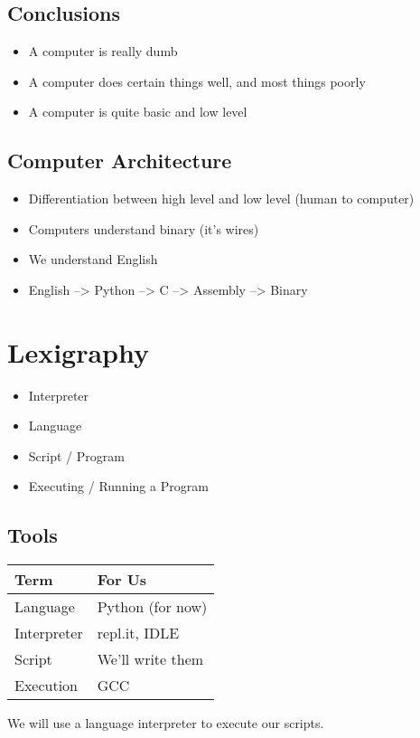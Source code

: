 \documentclass[11pt]{article}
\begin{document}
\subsection{Conclusions}
\label{sec:org1c7d0e5}
\begin{itemize}
\item A computer is really dumb
\item A computer does certain things well, and most things poorly
\item A computer is quite basic and low level
\end{itemize}
\subsection{Computer Architecture}
\label{sec:org0032d80}
\begin{itemize}
\item Differentiation between high level and low level (human to computer)
\item Computers understand binary (it's wires)
\item We understand English
\item English --> Python --> C --> Assembly --> Binary
\end{itemize}
\section{Lexigraphy}
\label{sec:org0992b84}
\begin{itemize}
\item Interpreter
\item Language
\item Script / Program
\item Executing / Running a Program
\end{itemize}
\subsection{Tools}
\label{sec:orgd1b8066}
\begin{center}
\begin{tabular}{ll}
Term & For Us\\
\hline
Language & Python (for now)\\
Interpreter & repl.it, IDLE\\
Script & We'll write them\\
Execution & GCC\\
\end{tabular}
\end{center}
We will use a language interpreter to execute our scripts.
\end{document}

